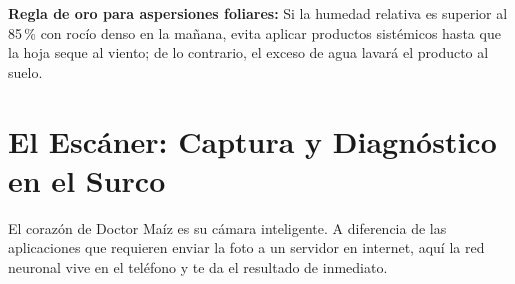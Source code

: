 \documentclass[11pt,a4paper]{report}
\begin{document}
\vspace{3mm}
\begin{campotip}
    \textbf{Regla de oro para aspersiones foliares:} Si la humedad relativa es superior al 85\,\% con rocío denso en la mañana, evita aplicar productos sistémicos hasta que la hoja seque al viento; de lo contrario, el exceso de agua lavará el producto al suelo.
\end{campotip}

\chapter{El Escáner: Captura y Diagnóstico en el Surco}

El corazón de Doctor Maíz es su cámara inteligente. A diferencia de las aplicaciones que requieren enviar la foto a un servidor en internet, aquí la red neuronal vive en el teléfono y te da el resultado de inmediato.
\end{document}
